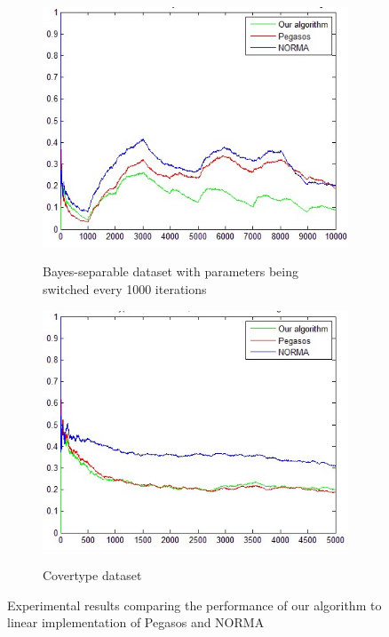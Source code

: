 \begin{figure}[t]
\begin{subfigure}[c]{.45\linewidth}
	   \includegraphics[width=0.9\linewidth]{PN_Switch_Lin}
\label{SL}
\caption{Bayes-separable dataset with parameters being switched every 1000 iterations}
\end{subfigure}%
\hspace{.01\linewidth}
\begin{subfigure}[c]{.45\linewidth}
	   \includegraphics[width=0.9\linewidth]{PN_Cov_Lin}
\label{CtL}
\caption{ Covertype dataset}
\end{subfigure}%
    \caption{Experimental results comparing the performance of our algorithm to linear implementation of Pegasos and NORMA}
    \label{Result:LinearPN}
\end{figure}

